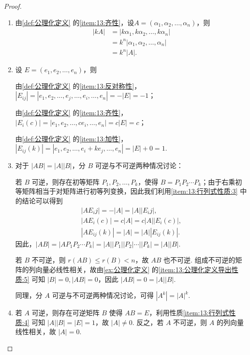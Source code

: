 \begin{proof}
    \begin{enumerate}[start=2]
        \item 由\autoref{def:公理化定义} 的\ref*{item:13:齐性}，设$A=(\alpha_1,\alpha_2,\ldots,\alpha_n)$，则
        \begin{align*}
            |kA| & =|k\alpha_1,k\alpha_2,\ldots,k\alpha_n| \\
                 & =k^n|\alpha_1,\alpha_2,\ldots,\alpha_n| \\
                 & =k^n|A|.
        \end{align*}

        \item 设 $E = (e_1, e_2, \ldots, e_n)$，则

            由\autoref{def:公理化定义} 的\ref*{item:13:反对称性}，$|E_{ij}| = |e_1, e_2, \ldots, e_j, \ldots, e_i, \ldots, e_n| = -|E| = -1$；

            由\autoref{def:公理化定义} 的\ref*{item:13:齐性}，$|E_i(c)| = |e_1, e_2, \ldots, c e_i, \ldots, e_n| = c|E| = c$；

            由\autoref{def:公理化定义} 的\ref*{item:13:加性}，$|E_{ij}(k)| = |e_1, e_2, \ldots, e_i + k e_j, \ldots, e_n| = |E| + 0 = 1$.

        \item 对于 $|AB| = |A||B|$，分 $B$ 可逆与不可逆两种情况讨论：

            若 $B$ 可逆，则存在初等矩阵 $P_1, P_2, \ldots, P_k$，使得 $B = P_1 P_2 \cdots P_k$；由于右乘初等矩阵相当于对矩阵进行初等列变换，因此我们利用\ref*{item:13:行列式性质:3} 中的结论可以得到
            \begin{gather*}
                |A E_ij| = -|A| = |A||E_ij|, \\
                |A E_i(c)| = c|A| = c|A||E_i(c)|, \\
                |A E_{ij}(k)| = |A| = |A||E_{ij}(k)|.
            \end{gather*}
            因此，$|AB| = |A P_1 P_2 \cdots P_k| = |A||P_1||P_2|\cdots||P_k| = |A||B|$.

            若 $B$ 不可逆，则 $r(AB) \leqslant r(B) < n$，故 $AB$ 也不可逆. 组成不可逆的矩阵的列向量必线性相关，故由\autoref{ex:公理化定义} 的\ref*{item:13:公理化定义导出性质:5} 可知 $|B|=0, |AB|=0$，因此 $|AB| = 0 = |A||B|$.

            同理，分 $A$ 可逆与不可逆两种情况讨论，可得 $|A^k|=|A|^k$.

        \item 若 $A$ 可逆，则存在可逆矩阵 $B$ 使得 $AB=E$，利用性质\ref*{item:13:行列式性质:4} 可知 $|A||B|=|E|=1$，故 $|A| \neq 0$. 反之，若 $A$ 不可逆，则 $A$ 的列向量线性相关，故 $|A| = 0$.


\end{enumerate}
\end{proof}
